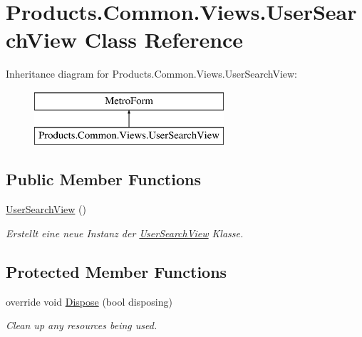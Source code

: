 \hypertarget{class_products_1_1_common_1_1_views_1_1_user_search_view}{}\section{Products.\+Common.\+Views.\+User\+Search\+View Class Reference}
\label{class_products_1_1_common_1_1_views_1_1_user_search_view}
Inheritance diagram for Products.\+Common.\+Views.\+User\+Search\+View\+:\begin{figure}[H]
\begin{center}
\leavevmode
\includegraphics[height=2.000000cm]{class_products_1_1_common_1_1_views_1_1_user_search_view}
\end{center}
\end{figure}
\subsection*{Public Member Functions}
\begin{DoxyCompactItemize}
\item 
\hyperlink{class_products_1_1_common_1_1_views_1_1_user_search_view_a15aca2af547c801a1f4d4ae7e2ae95bb}{User\+Search\+View} ()
\begin{DoxyCompactList}\small\item\em Erstellt eine neue Instanz der \hyperlink{class_products_1_1_common_1_1_views_1_1_user_search_view}{User\+Search\+View} Klasse. \end{DoxyCompactList}\end{DoxyCompactItemize}
\subsection*{Protected Member Functions}
\begin{DoxyCompactItemize}
\item 
override void \hyperlink{class_products_1_1_common_1_1_views_1_1_user_search_view_af47a584494907910fa4411c3fb8ada70}{Dispose} (bool disposing)
\begin{DoxyCompactList}\small\item\em Clean up any resources being used. \end{DoxyCompactList}\end{DoxyCompactItemize}

